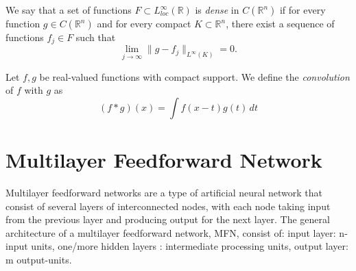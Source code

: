 \documentclass[../main.tex]{subfiles}
\begin{document}
\begin{definition}We say that a set of functions $F\subset L_{loc}^{\infty}(\mathbb{R})$ is \emph{dense} in $C(\mathbb{R}^n)$ if for every function $g\in C(\mathbb{R}^n)$ and for every compact $K\subset \mathbb{R}^n$, there exist a sequence of functions $f_j\in F$ such that $$\lim_{j\rightarrow\infty} \|g-f_j\|_{L^\infty(K)}=0.$$ 
\end{definition}


\begin{definition}
	Let $f,g$ be real-valued functions with compact support. We define the \emph{convolution} of $f$ with $g$ as $$(f\ast g)(x)=\int f(x-t)g(t) \, dt$$
\end{definition}



\section{Multilayer Feedforward Network}
\noindent Multilayer feedforward networks are a type of artificial neural network that consist of several layers of interconnected nodes, with each node taking input from the previous layer and producing output for the next layer. The general architecture of a multilayer feedforward network, MFN, consist of: input layer: n-input units,  one/more hidden layers : intermediate processing units, output layer: m output-units. 
\end{document}
